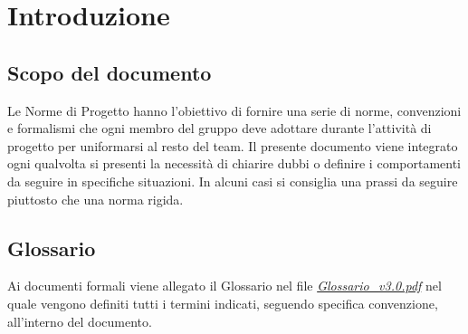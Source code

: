 \section{Introduzione}{

	\subsection{Scopo del documento}{
	Le Norme di Progetto hanno l'obiettivo di fornire una serie di norme, convenzioni e formalismi che ogni membro del gruppo deve adottare durante l'attività di progetto per uniformarsi al resto del team. Il presente documento viene integrato ogni qualvolta si presenti la necessità di chiarire dubbi o definire i comportamenti da seguire in specifiche situazioni. In alcuni casi si consiglia una prassi da seguire piuttosto che una norma rigida.	 }
	\subsection{Glossario}{ 
	Ai documenti formali viene allegato il Glossario nel file  \emph{\href{../Esterni/Glossario_v3.0.pdf}{Glossario\_v3.0.pdf}} nel quale vengono definiti tutti i termini indicati, seguendo specifica convenzione, all'interno del documento.
	}
	
}